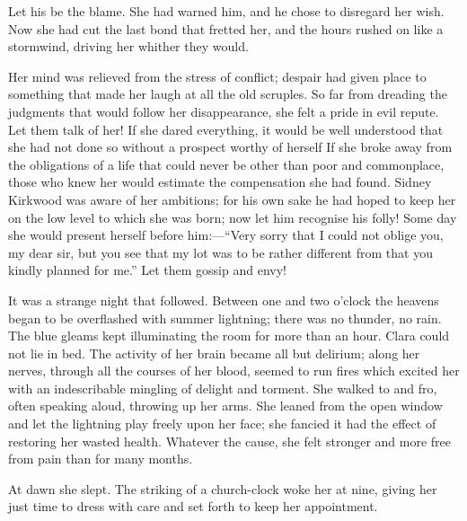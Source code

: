 Let his be the blame. She had warned him, and he chose to disregard her
wish. Now she had cut the last bond that fretted her, and the hours
rushed on like a stormwind, driving her whither they would.

Her mind was relieved from the stress of conflict; despair had given
place to something that made her laugh at all the old scruples. So far
from dreading the judgments that would follow her disappearance, she
felt a pride in evil repute. Let them talk of her! If she dared
everything, it would be well understood that she had not done so without
a prospect worthy of herself If she broke away from the obligations of a
life that could never be other than poor and commonplace, those who knew
her would estimate the compensation she had found. Sidney Kirkwood was
aware of her ambitions; for his {}own sake he had hoped to keep her on
the low level to which she was born; now let him recognise his folly!
Some day she would present herself before him:---``Very sorry that I
could not oblige you, my dear sir, but you see that my lot was to be
rather different from that you kindly planned for me.'' Let them gossip
and envy!

It was a strange night that followed. Between one and two o'clock the
heavens began to be overflashed with summer lightning; there was no
thunder, no rain. The blue gleams kept illuminating the room for more
than an hour. Clara could not lie in bed. The activity of her brain
became all but delirium; along her nerves, through all the courses of
her blood, seemed to run fires which excited her with an indescribable
mingling of delight and torment. She walked to and fro, often speaking
aloud, throwing up her arms. She leaned from the open window and let the
lightning play freely upon her face; she fancied it had the effect of
restoring her wasted health. Whatever the cause, she felt {}stronger and
more free from pain than for many months.

At dawn she slept. The striking of a church-clock woke her at nine,
giving her just time to dress with care and set forth to keep her
appointment.

